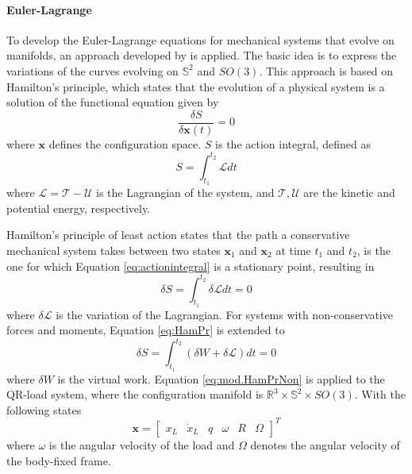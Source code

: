 \paragraph{Euler-Lagrange} To develop the Euler-Lagrange equations for mechanical systems that evolve on manifolds, an approach developed by \cite{Lee2008,Lee2005,Lee2009,Lee2011} is applied. 
The basic idea is to express the variations of the curves evolving on $ \mathbb{S}^2 $ and $ SO(3) $. 
This approach is based on Hamilton's principle, which states that the evolution of a physical system is a solution of the functional equation given by
\begin{equation}\label{key}
\frac{\delta S}{\delta \mathbf{x}(t)}=0
\end{equation}
where $ \mathbf{x} $ defines the configuration space. $ S $ is the action integral, defined as
\begin{equation}\label{eq:actionintegral}
S=\int_{t_1}^{t_2}\mathcal{L}dt
\end{equation}
where $\mathcal{L}=\mathcal{T}-\mathcal{U} $ is the Lagrangian of the system, and $\mathcal{T},\mathcal{U}$ are the kinetic and potential energy, respectively. 

Hamilton's principle of least action states that the path a conservative mechanical system takes between two states $ \mathbf{x}_1 $ and $ \mathbf{x}_2 $ at time $ t_1 $ and $ t_2 $, is the one for which Equation \ref{eq:actionintegral} is a stationary point, resulting in
\begin{equation}\label{eq:HamPr}
\delta S=\int_{t_1}^{t_2}\delta\mathcal{L}dt=0
\end{equation}
where $ \delta\mathcal{L} $ is the variation of the Lagrangian. For systems with non-conservative forces and moments, Equation \ref{eq:HamPr} is extended to
\begin{equation}\label{eq:mod.HamPrNon}
\delta S=\int_{t_1}^{t_2}(\delta W+\delta\mathcal{L})dt=0
\end{equation}
where $ \delta W $ is the virtual work. Equation \ref{eq:mod.HamPrNon} is applied to the QR-load system, where the configuration manifold is $ \mathbb{R}^3\times \mathbb{S}^2\times SO(3) $. With the following states
\begin{equation}
\textbf{x}= \begin{bmatrix}x_L& \dot{x}_L& q& \omega&R&\Omega
\end{bmatrix}^T
\end{equation}
where $ \omega $ is the angular velocity of the load and $ \Omega $ denotes the angular velocity of the body-fixed frame. 

